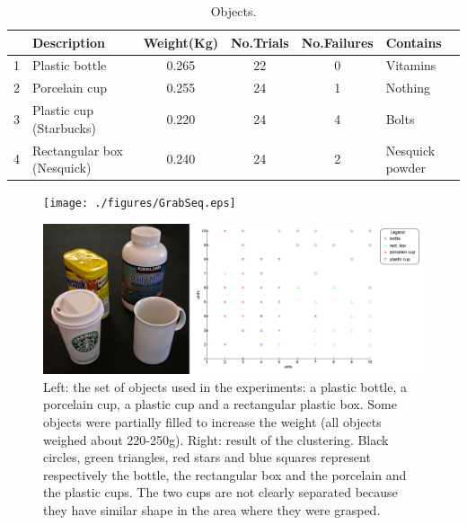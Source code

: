 \begin{table}[htb]
  \caption{Objects.} \label{tab:objects} \centering
  \begin{tabular}{|c|l|c|c|c|l|}
    \hline
    &Description& Weight(Kg)&No.Trials&No.Failures&Contains \\
    \hline
    1&Plastic bottle        & 0.265 & 22& 0 & Vitamins\\
    2&Porcelain cup & 0.255 & 24& 1 & Nothing\\
    3&Plastic cup (Starbucks)      & 0.220 & 24& 4 & Bolts \\
    4&Rectangular box (Nesquick)        & 0.240 & 24& 2 & Nesquick powder\\

    \hline
  \end{tabular}
\end{table}

\begin{figure}[tbp]
\centerline{
\texttt{[image: ./figures/GrabSeq.eps]}
}\caption[Grasping sequence]{}
\label{fig:Objects}
\end{figure}

\begin{figure}[tbp]
\centerline{
\includegraphics[width=6.0in]{./figures/objects-clusters2.eps}
}\caption[Objects grabbed and clustering]{Left: the set of objects
used in the experiments: a plastic bottle, a porcelain cup, a
plastic cup and a rectangular plastic box. Some objects were
partially filled to increase the weight (all objects weighed about
220-250g). Right: result of the clustering. Black circles, green
triangles, red stars and blue squares represent respectively the
bottle, the rectangular box and the porcelain and the plastic
cups. The two cups are not clearly separated because they have
similar shape in the area where they were grasped.}
\label{fig:Objects}
\end{figure}

